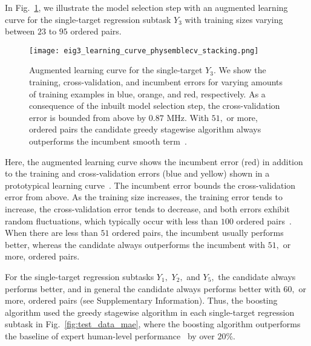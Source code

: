 \documentclass[aps,twocolumn,superscriptaddress,floatfix,preprintnumbers,showkeys]{revtex4}
\begin{document}
In Fig.~\ref{fig:eig_learning_curve}, we illustrate the model selection step with an augmented learning curve for the single-target regression subtask $Y_{3}$ with training sizes varying between $23$ to $95$ ordered pairs.
\begin{figure}
\centering
\texttt{[image: eig3\_learning\_curve\_physemblecv\_stacking.png]}
\caption{Augmented learning curve for the single-target $Y_{3}.$ We show the training, cross-validation, and incumbent errors for varying amounts of training examples in blue, orange, and red, respectively. As a consequence of the inbuilt model selection step, the cross-validation error is bounded from above by $0.87$ MHz. With $51,$ or more, ordered pairs the candidate greedy stagewise algorithm always outperforms the incumbent smooth term~\cite{Roushan_2017, Neill_2018, Chiaro_2019}.}
\label{fig:eig_learning_curve}
\end{figure}
Here, the augmented learning curve shows the incumbent error (red) in addition to the training and cross-validation errors (blue and yellow) shown in a prototypical learning curve~\cite{Hastie_2009, Sklearn_2011, Ng_2020}. The incumbent error bounds the cross-validation error from above. As the training size increases, the training error tends to increase, the cross-validation error tends to decrease, and both errors exhibit random fluctuations, which typically occur with less than $100$ ordered pairs~\cite{Ng_2020}. When there are less than $51$ ordered pairs, the incumbent usually performs better, whereas the candidate always outperforms the incumbent with $51,$ or more, ordered pairs. 

For the single-target regression subtasks $Y_{1},$ $Y_{2},$ and $Y_{5},$ the candidate always performs better, and in general the candidate always performs better with $60,$ or more, ordered pairs (see Supplementary Information). Thus, the boosting algorithm used the greedy stagewise algorithm in each single-target regression subtask in Fig.~\ref{fig:test_data_mae}, where the boosting algorithm outperforms the baseline of expert human-level performance~\cite{Roushan_2017, Neill_2018, Chiaro_2019} by over $20\%.$
\end{document}
